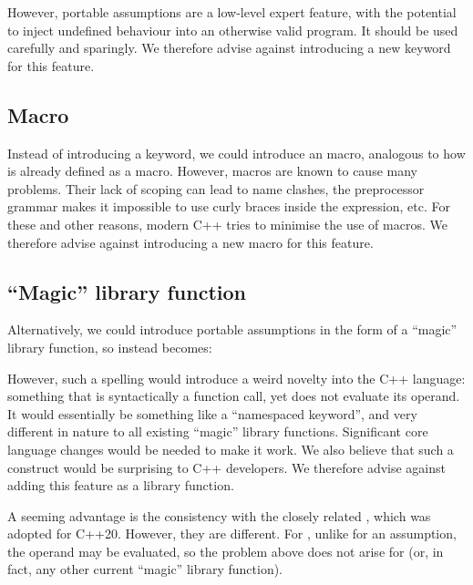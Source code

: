 \forceindent
{}

However, portable assumptions are a low-level expert feature, with the potential to inject undefined behaviour into an otherwise valid program. It should be used carefully and sparingly. We therefore advise against introducing a new keyword for this feature.


\subsection{Macro}

Instead of introducing a keyword, we could introduce an  macro, analogous to how  is already defined as a macro. However, macros are known to cause many problems. Their lack of scoping can lead to name clashes, the preprocessor grammar makes it impossible to use curly braces inside the expression, etc. For these and other reasons, modern C++ tries to minimise the use of macros. We therefore advise against introducing a new macro for this feature.

\subsection{``Magic'' library function}

Alternatively, we could introduce portable assumptions in the form of a ``magic'' library function, so  instead becomes:

\forceindent

However, such a spelling would introduce a weird novelty into the C++ language: something that is syntactically a function call, yet does not evaluate its operand. It would essentially be something like a ``namespaced keyword'', and very different in nature to all existing ``magic'' library functions. Significant core language changes would be needed to make it work. We also believe that such a construct would be surprising to C++ developers. We therefore advise against adding this feature as a library function.

A seeming advantage is the consistency with the closely related  \cite{P1007R3}, which was adopted for C++20. However, they are different. For ,  unlike for an assumption, the operand may be evaluated, so the problem above does not arise for  (or, in fact, any other current ``magic'' library function).

